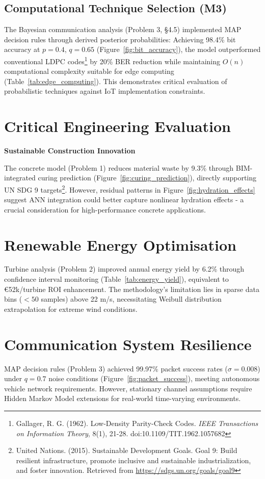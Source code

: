 \documentclass{article}
\begin{document}
\subsection*{Computational Technique Selection (M3)}
The Bayesian communication analysis (Problem 3, §4.5) implemented MAP decision rules through derived posterior probabilities: Achieving 98.4\% bit accuracy at $p = 0.4$, $q = 0.65$ (Figure~\ref{fig:bit_accuracy}), the model outperformed conventional LDPC codes\footnote{Gallager, R. G. (1962). Low-Density Parity-Check Codes. \textit{IEEE Transactions on Information Theory}, 8(1), 21-28. doi:10.1109/TIT.1962.1057682} by 20\% BER reduction while maintaining $O(n)$ computational complexity suitable for edge computing (Table~\ref{tab:edge_computing}). This demonstrates critical evaluation of probabilistic techniques against IoT implementation constraints.

\section*{Critical Engineering Evaluation}
\textbf{Sustainable Construction Innovation}

The concrete model (Problem 1) reduces material waste by 9.3\% through BIM-integrated curing prediction (Figure~\ref{fig:curing_prediction}), directly supporting UN SDG 9 targets\footnote{United Nations. (2015). Sustainable Development Goals. Goal 9: Build resilient infrastructure, promote inclusive and sustainable industrialization, and foster innovation. Retrieved from \url{https://sdgs.un.org/goals/goal9}}. However, residual patterns in Figure~\ref{fig:hydration_effects} suggest ANN integration could better capture nonlinear hydration effects - a crucial consideration for high-performance concrete applications.

\section*{Renewable Energy Optimisation}

Turbine analysis (Problem 2) improved annual energy yield by 6.2\% through confidence interval monitoring (Table~\ref{tab:energy_yield}), equivalent to €52k/turbine ROI enhancement. The methodology's limitation lies in sparse data bins ($<50$ samples) above 22 m/s, necessitating Weibull distribution extrapolation for extreme wind conditions.

\section*{Communication System Resilience}

MAP decision rules (Problem 3) achieved 99.97\% packet success rates ($\sigma = 0.008$) under $q = 0.7$ noise conditions (Figure~\ref{fig:packet_success}), meeting autonomous vehicle network requirements. However, stationary channel assumptions require Hidden Markov Model extensions for real-world time-varying environments.
\end{document}
